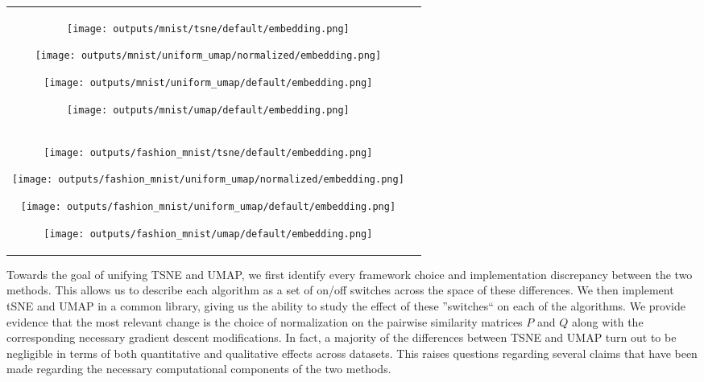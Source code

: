 \documentclass[sigconf, nonacm]{acmart}
\newcommand\ourmethod{Uniform UMAP }
\begin{document}
\begin{figure*}[h]
    \begin{tabular}{cc}
        \texttt{[image: outputs/mnist/tsne/default/embedding.png]}\par
        \texttt{[image: outputs/mnist/uniform\_umap/normalized/embedding.png]}\par
        \texttt{[image: outputs/mnist/uniform\_umap/default/embedding.png]}\par
        \texttt{[image: outputs/mnist/umap/default/embedding.png]}\\
        \texttt{[image: outputs/fashion\_mnist/tsne/default/embedding.png]}\par
        \texttt{[image: outputs/fashion\_mnist/uniform\_umap/normalized/embedding.png]}\par
        \texttt{[image: outputs/fashion\_mnist/uniform\_umap/default/embedding.png]}\par
        \texttt{[image: outputs/fashion\_mnist/umap/default/embedding.png]}
    \end{tabular}
\caption{Uniform UMAP is able to recreate both TSNE and UMAP embeddings by just changing two hyperparameters. Images above are on the MNIST (top row) and
Fashion MNIST (bottom row) datasets. From left to right: TSNE, \ourmethod with normalization, \ourmethod and UMAP}
\end{figure*}

Towards the goal of unifying TSNE and UMAP, we first identify every framework choice and implementation discrepancy between the two methods. This allows us to describe each algorithm as a set of on/off
switches across the space of these differences. We then implement tSNE and UMAP in a common library, giving us the ability to study the effect of these
''switches`` on each of the algorithms.
We provide evidence that the most relevant change is the choice of normalization on the pairwise similarity matrices $P$ and $Q$ along with the corresponding
necessary gradient descent modifications.
In fact, a majority of the differences between TSNE and UMAP turn out to be negligible in terms of both quantitative and qualitative effects across datasets.
This raises questions regarding several claims that have been made regarding the necessary computational components of the two methods.
\end{document}
